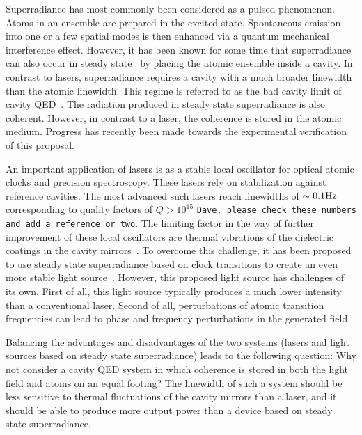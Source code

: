 \documentclass[aps,prl,twocolumn,
superscriptaddress,groupedaddress]{revtex4}
\newcommand{\dmcomment}[1]{{\tt #1}}
\begin{document}
Superradiance has most commonly been considered as a pulsed phenomenon.
Atoms in an ensemble are prepared in the excited state.  Spontaneous
emission into one or a few spatial modes is then enhanced via a quantum
mechanical interference effect.  However, it has been known for some
time that superradiance can also occur in steady
state~\cite{PhysRevLett.102.163601, PhysRevA.81.033847,
PhysRevA.81.063827,PhysRevLett.89.253003} by placing the atomic ensemble
inside a cavity.  In contrast to lasers, superradiance requires a cavity
with a much broader linewidth than the atomic linewidth.  This regime is
referred to as the bad cavity limit of cavity QED~\cite{PhysRevA.51.809,
PhysRevLett.72.3815, ChenDeliciousLaser, HakenLaser, HakenLaserBook}.
The radiation produced in steady state superradiance is also coherent.
However, in contrast to a laser, the coherence is stored in the atomic
medium.  Progress has recently been made towards the experimental
verification~\cite{ThompsonPaper} of this proposal.

An important application of lasers is as a stable local oscillator for
optical atomic clocks and precision spectroscopy.  These lasers rely on
stabilization against reference cavities.  The most advanced such lasers
reach linewidths of $\sim 0.1 {\rm Hz}$ corresponding to quality factors
of $Q>10^{15}$ \dmcomment{Dave, please check these numbers and add a
reference or two}.  The limiting factor in the way of further
improvement of these local oscillators are thermal vibrations of the
dielectric coatings in the cavity mirrors~\cite{PhysRevLett.101.260602}.
To overcome this challenge, it has been proposed to use steady state
superradiance based on clock transitions to create an even more stable
light source~\cite{prospectsofamillihertzlaser,ChenDeliciousLaser}.
However, this proposed light source has challenges of its own.  First of
all, this light source typically produces a much lower intensity than a
conventional laser.  Second of all, perturbations of atomic transition
frequencies can lead to phase and frequency perturbations in the
generated field.

Balancing the advantages and disadvantages of the two systems (lasers
and light sources based on steady state superradiance) leads to the
following question: Why not consider a cavity QED system in which
coherence is stored in both the light field and atoms on an equal
footing? The linewidth of such a system should be less sensitive to
thermal fluctuations of the cavity mirrors than a laser, and it should
be able to produce more output power than a device based on steady state
superradiance.
\end{document}
